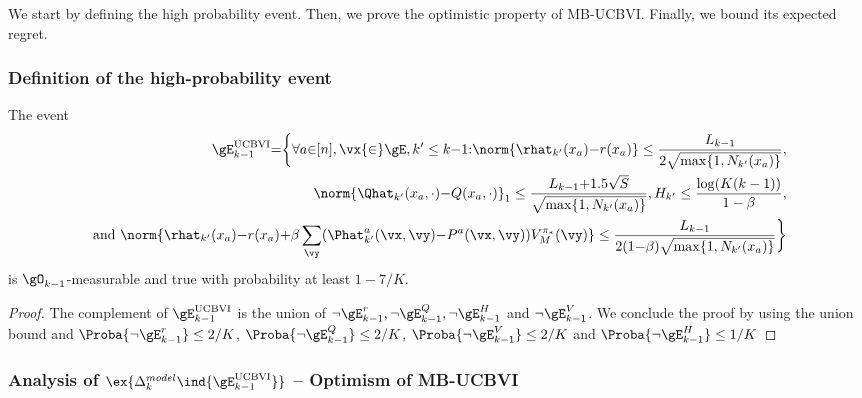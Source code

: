 \begin{subappendices}
We start by defining the high probability event. Then, we prove the optimistic property of MB-UCBVI. Finally, we bound its expected regret.

\subsubsection{Definition of the high-probability event}

\begin{lem}
    \label{lem:concentration_ucbvi}
    The event
    \begin{align*}
        \gE^\text{UCBVI}_{k-1} {=}\bigg\{ \forall a{\in}[n], \vx{\in}\gE, k'\le k{-}1{:}
            \norm{\rhat_{k'}(x_a){-}r(x_a)} \le\frac{L_{k-1}}{2\sqrt{\max\{1,N_{k'}(x_a)\} }}, \\
            \norm{\Qhat_{k'}(x_a,\cdot) {-}Q(x_a,\cdot)}_1 \le\frac{L_{k-1}{+}1.5\sqrt{S}}{\sqrt{\max\{1,N_{k'}(x_a)\} }}, H_{k'}\le \frac{\log(K(k-1))}{1-\beta}, \\
        \text{ and } \norm{\rhat_{k'}(x_a){-}r(x_a) {+}\beta\sum_{\vy}(\Phat_{k'}^a(\vx,\vy){-}P^a(\vx,\vy))V_M^{\pi_*}(\vy)} \le\frac{L_{k-1}}{2(1{-}\beta)\sqrt{\max\{1,N_{k'}(x_a)\} }} \bigg\}
    \end{align*}
    is $\gO_{k-1}$-measurable and true with probability at least $1-7/K$.
\end{lem}
\begin{proof}
    The complement of $\gE_{k-1}^\text{UCBVI}$ is the union of $\neg \gE_{k-1}^r, \neg \gE_{k-1}^Q, \neg \gE_{k-1}^H$ and $\neg \gE_{k-1}^V$.
    We conclude the proof by using the union bound and $\Proba{\neg \gE_{k-1}^r} \le 2/K$, $\Proba{\neg \gE_{k-1}^Q} \le 2/K$, $\Proba{\neg \gE_{k-1}^V} \le 2/K$ and $\Proba{\neg \gE_{k-1}^H} \le 1/K$
\end{proof}

\subsubsection{Analysis of $\ex{\Delta^{model}_k \ind{\gE_{k-1}^\text{UCBVI}}}$ -- Optimism of MB-UCBVI}


\end{subappendices}

